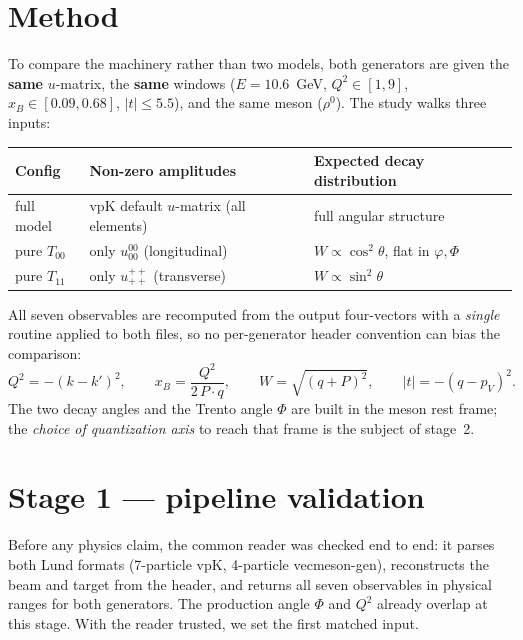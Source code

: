 \documentclass[11pt]{article}
\newcommand{\uij}[2]{u^{#1}_{#2}}
\begin{document}
\section{Method}
To compare the machinery rather than two models, both generators are given the \textbf{same} $u$-matrix, the
\textbf{same} windows ($E=10.6$~GeV, $Q^2\in[1,9]$, $x_B\in[0.09,0.68]$, $|t|\le5.5$), and the same meson
($\rho^0$). The study walks three inputs:

\begin{center}\small
\begin{tabular}{@{}lll@{}}
\toprule
Config & Non-zero amplitudes & Expected decay distribution \\
\midrule
full model & vpK default $u$-matrix (all elements) & full angular structure \\
pure $T_{00}$ & only $\uij{00}{00}$ (longitudinal) & $W\propto\cos^2\!\theta$, flat in $\varphi,\Phi$ \\
pure $T_{11}$ & only $\uij{++}{++}$ (transverse) & $W\propto\sin^2\!\theta$ \\
\bottomrule
\end{tabular}
\end{center}

All seven observables are recomputed from the output four-vectors with a \emph{single} routine applied to
both files, so no per-generator header convention can bias the comparison:
\begin{equation}
Q^2=-(k-k')^2,\qquad x_B=\frac{Q^2}{2\,P\!\cdot\!q},\qquad W=\sqrt{(q+P)^2},\qquad |t|=-(q-p_V)^2 .
\end{equation}
The two decay angles and the Trento angle $\Phi$ are built in the meson rest frame; the \emph{choice of
quantization axis} to reach that frame is the subject of stage~2.

\section{Stage 1 --- pipeline validation}
Before any physics claim, the common reader was checked end to end: it parses both Lund formats (7-particle
vpK, 4-particle vecmeson-gen), reconstructs the beam and target from the header, and returns all seven observables in
physical ranges for both generators. The production angle $\Phi$ and $Q^2$ already overlap at this stage.
With the reader trusted, we set the first matched input.

\end{document}
